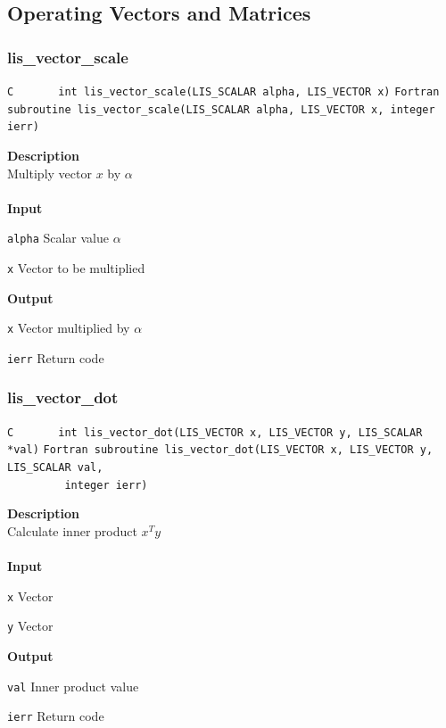 \documentclass[a4paper]{article}
\newcommand{\namelistlabel}[1]{\mbox{#1}\hfill}
\newenvironment{namelist}[1]{%
 \begin{list}{}
  {\let\makelabel\namelistlabel
  \settowidth{\labelwidth}{#1}
  \setlength{\leftmargin}{1.1\labelwidth}}
}{%
\end{list}}
\begin{document}
\subsection{Operating Vectors and Matrices}
  \subsubsection{lis\_vector\_scale}
\begin{screen}
\verb|C       int lis_vector_scale(LIS_SCALAR alpha, LIS_VECTOR x)|
\verb|Fortran subroutine lis_vector_scale(LIS_SCALAR alpha, LIS_VECTOR x, integer ierr)|
\end{screen}
{\bf Description}\\
\indent
Multiply vector $x$ by $\alpha$
\\ \\
\noindent
{\bf Input}
\begin{namelist}{XXXXXXXXXXXXXXXXXXXX}
\item[\tt alpha] Scalar value $\alpha$
\item[\tt x] Vector to be multiplied
\end{namelist}
{\bf Output}
\begin{namelist}{XXXXXXXXXXXXXXXXXXXX}
\item[\tt x] Vector multiplied by $\alpha$
\item[\tt ierr] Return code
\end{namelist}
  \subsubsection{lis\_vector\_dot}
\begin{screen}
\verb|C       int lis_vector_dot(LIS_VECTOR x, LIS_VECTOR y, LIS_SCALAR *val)|
\verb|Fortran subroutine lis_vector_dot(LIS_VECTOR x, LIS_VECTOR y, LIS_SCALAR val,|\\
\verb|         integer ierr)|
\end{screen}
{\bf Description}\\
\indent
Calculate inner product $x^{T}y$
\\ \\
\noindent
{\bf Input}
\begin{namelist}{XXXXXXXXXXXXXXXXXXXX}
\item[\tt x] Vector
\item[\tt y] Vector
\end{namelist}
{\bf Output}
\begin{namelist}{XXXXXXXXXXXXXXXXXXXX}
\item[\tt val] Inner product value
\item[\tt ierr] Return code
\end{namelist}
\newpage
\end{document}
